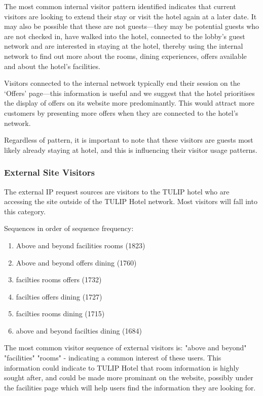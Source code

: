 The most common internal visitor pattern identified indicates that current visitors are looking to extend their stay or visit the hotel again at a later date. It may also be possible that these are not guests---they may be potential guests who are not checked in, have walked into the hotel, connected to the lobby's guest network and are interested in staying at the hotel, thereby using the internal network to find out more about the rooms, dining experiences, offers available and about the hotel's facilities.

Visitors connected to the internal network typically end their session on the `Offers' page---this information is useful and we suggest that the hotel prioritises the display of offers on its website more predominantly. This would attract more customers by presenting more offers when they are connected to the hotel's network.

Regardless of pattern, it is important to note that these visitors are guests most likely already staying at hotel, and this is influencing their visitor usage patterns.


\subsubsection{External Site Visitors}

The external IP request sources are visitors to the TULIP hotel who are accessing the site outside of the TULIP Hotel network. Most visitors will fall into this category.

\label{sec:results:ip_source:external}

Sequences in order of sequence frequency:
\begin{enumerate}
  \item Above and beyond \ra facilities \ra rooms (1823)
  \item Above and beyond \ra offers \ra dining (1760)
  \item facilties \ra rooms \ra offers (1732)
  \item facilties \ra offers \ra dining (1727)
  \item facilties \ra rooms \ra dining (1715)
  \item above and beyond \ra facilties \ra dining (1684)
\end{enumerate}

The most common visitor sequence of external visitors is: "above and beyond" \ra  "facilities" \ra  "rooms" - indicating a common interest of these users. This information could indicate to TULIP Hotel that room information is highly sought after, and could be made more prominant on the website, possibly under the facilities page which will help users find the information they are looking for.


